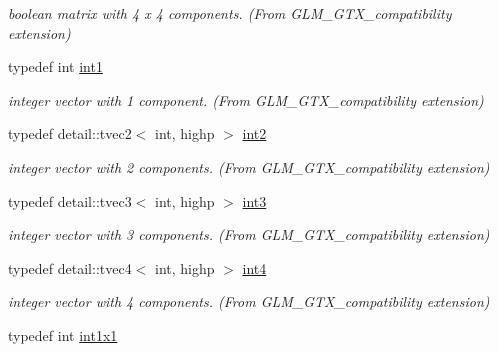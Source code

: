 \begin{CompactItemize}
\begin{CompactList}\small\item\em boolean matrix with 4 x 4 components. (From GLM\_\-GTX\_\-compatibility extension) \item\end{CompactList}\item 
\hypertarget{group__gtx__compatibility_gba41d7803e4b24c17656d74377b88286}{
typedef int \hyperlink{group__gtx__compatibility_gba41d7803e4b24c17656d74377b88286}{int1}}
\label{group__gtx__compatibility_gba41d7803e4b24c17656d74377b88286}

\begin{CompactList}\small\item\em integer vector with 1 component. (From GLM\_\-GTX\_\-compatibility extension) \item\end{CompactList}\item 
\hypertarget{group__gtx__compatibility_g3f999377257cbda84c745b688ddcba81}{
typedef detail::tvec2$<$ int, highp $>$ \hyperlink{group__gtx__compatibility_g3f999377257cbda84c745b688ddcba81}{int2}}
\label{group__gtx__compatibility_g3f999377257cbda84c745b688ddcba81}

\begin{CompactList}\small\item\em integer vector with 2 components. (From GLM\_\-GTX\_\-compatibility extension) \item\end{CompactList}\item 
\hypertarget{group__gtx__compatibility_gc305b0da08fad90d91854569679c935e}{
typedef detail::tvec3$<$ int, highp $>$ \hyperlink{group__gtx__compatibility_gc305b0da08fad90d91854569679c935e}{int3}}
\label{group__gtx__compatibility_gc305b0da08fad90d91854569679c935e}

\begin{CompactList}\small\item\em integer vector with 3 components. (From GLM\_\-GTX\_\-compatibility extension) \item\end{CompactList}\item 
\hypertarget{group__gtx__compatibility_g9f621a690aa1c2918a9a8a684376b562}{
typedef detail::tvec4$<$ int, highp $>$ \hyperlink{group__gtx__compatibility_g9f621a690aa1c2918a9a8a684376b562}{int4}}
\label{group__gtx__compatibility_g9f621a690aa1c2918a9a8a684376b562}

\begin{CompactList}\small\item\em integer vector with 4 components. (From GLM\_\-GTX\_\-compatibility extension) \item\end{CompactList}\item 
\hypertarget{group__gtx__compatibility_g09016a637a3cd093c22e6188080ac750}{
typedef int \hyperlink{group__gtx__compatibility_g09016a637a3cd093c22e6188080ac750}{int1x1}}
\label{group__gtx__compatibility_g09016a637a3cd093c22e6188080ac750}


\end{CompactItemize}
